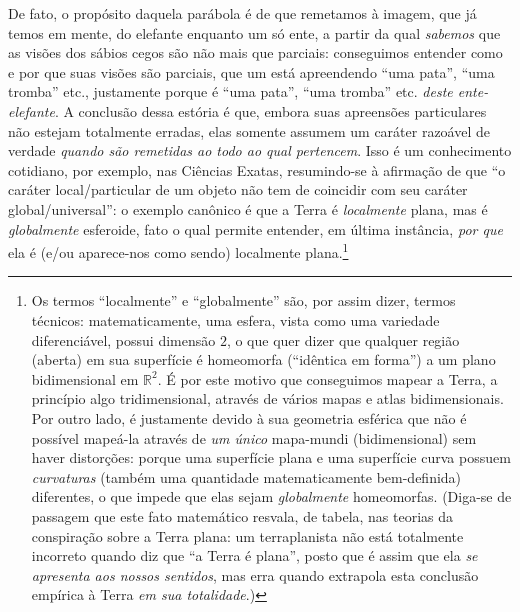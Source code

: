 De fato, o propósito daquela parábola é de que remetamos à imagem, que já temos em mente, do elefante enquanto um só ente, a partir da qual \textit{sabemos} que as visões dos sábios cegos são não mais que parciais: conseguimos entender como e por que suas visões são parciais, que um está apreendendo ``uma pata'', ``uma tromba'' etc., justamente porque é ``uma pata'', ``uma tromba'' etc. \textit{deste ente-elefante}. A conclusão dessa estória é que, embora suas apreensões particulares não estejam totalmente erradas, elas somente assumem um caráter razoável de verdade \textit{quando são remetidas ao todo ao qual pertencem}. Isso é um conhecimento cotidiano, por exemplo, nas Ciências Exatas, resumindo-se à afirmação de que ``o caráter local/particular de um objeto não tem de coincidir com seu caráter global/universal'': o exemplo canônico é que a Terra é \textit{localmente} plana, mas é \textit{globalmente} esferoide, fato o qual permite entender, em última instância, \textit{por que} ela é (e/ou aparece-nos como sendo) localmente plana.\footnote{Os termos ``localmente'' e ``globalmente'' são, por assim dizer, termos técnicos: matematicamente, uma esfera, vista como uma variedade diferenciável, possui dimensão $2$, o que quer dizer que qualquer região (aberta) em sua superfície é homeomorfa (``idêntica em forma'') a um plano bidimensional em $\mathbb{R}^2$. É por este motivo que conseguimos mapear a Terra, a princípio algo tridimensional, através de vários mapas e atlas bidimensionais. Por outro lado, é justamente devido à sua geometria esférica que não é possível mapeá-la através de \textit{um único} mapa-mundi (bidimensional) sem haver distorções: porque uma superfície plana e uma superfície curva possuem \textit{curvaturas} (também uma quantidade matematicamente bem-definida) diferentes, o que impede que elas sejam \textit{globalmente} homeomorfas. (Diga-se de passagem que este fato matemático resvala, de tabela, nas teorias da conspiração sobre a Terra plana: um terraplanista não está totalmente incorreto quando diz que ``a Terra é plana'', posto que é assim que ela \textit{se apresenta aos nossos sentidos}, mas erra quando extrapola esta conclusão empírica à Terra \textit{em sua totalidade}.)}

